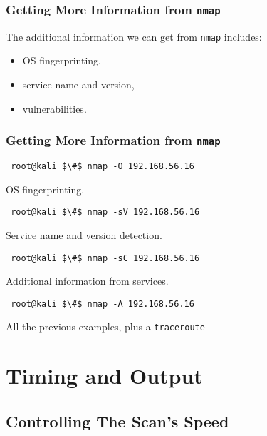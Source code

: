 \documentclass[aspectratio=169,xcolor=dvipsnames]{beamer}
\begin{document}
\begin{frame}
    \frametitle{Getting More Information from \texttt{nmap}}

    The additional information we can get from \texttt{nmap} includes:

    \begin{itemize}
        \item OS fingerprinting,
        \item service name and version,
        \item vulnerabilities.
    \end{itemize}

\end{frame}

\begin{frame}[fragile]
    \frametitle{Getting More Information from \texttt{nmap}}

    \begin{lstlisting}
 root@kali $\#$ nmap -O 192.168.56.16
    \end{lstlisting}

    OS fingerprinting.

    \pause

    \begin{lstlisting}
 root@kali $\#$ nmap -sV 192.168.56.16
    \end{lstlisting}

    Service name and version detection.

    \pause

    \begin{lstlisting}
 root@kali $\#$ nmap -sC 192.168.56.16
    \end{lstlisting}

    Additional information from services.

    \pause

    \begin{lstlisting}
 root@kali $\#$ nmap -A 192.168.56.16
    \end{lstlisting}

    All the previous examples, plus a \texttt{traceroute}

\end{frame}

\section{Timing and Output}

\subsection{Controlling The Scan's Speed}
\end{document}
